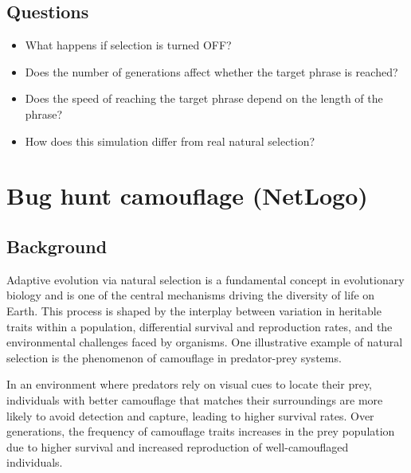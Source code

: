 \documentclass[
  a4paper]{book}
\providecommand{\tightlist}{%
  \setlength{\itemsep}{0pt}\setlength{\parskip}{0pt}}
\begin{document}
\section{Questions}\label{questions}

\begin{itemize}
\tightlist
\item
  What happens if selection is turned OFF?
\end{itemize}

\begin{itemize}
\tightlist
\item
  Does the number of generations affect whether the target phrase is reached?
\end{itemize}

\begin{itemize}
\tightlist
\item
  Does the speed of reaching the target phrase depend on the length of the phrase?
\end{itemize}

\begin{itemize}
\tightlist
\item
  How does this simulation differ from real natural selection?
\end{itemize}

\chapter{Bug hunt camouflage (NetLogo)}\label{bug-hunt-camouflage-netlogo}

\section{Background}\label{background-1}

Adaptive evolution via natural selection is a fundamental concept in evolutionary biology and is one of the central mechanisms driving the diversity of life on Earth. This process is shaped by the interplay between variation in heritable traits within a population, differential survival and reproduction rates, and the environmental challenges faced by organisms. One illustrative example of natural selection is the phenomenon of camouflage in predator-prey systems.

In an environment where predators rely on visual cues to locate their prey, individuals with better camouflage that matches their surroundings are more likely to avoid detection and capture, leading to higher survival rates. Over generations, the frequency of camouflage traits increases in the prey population due to higher survival and increased reproduction of well-camouflaged individuals.
\end{document}
